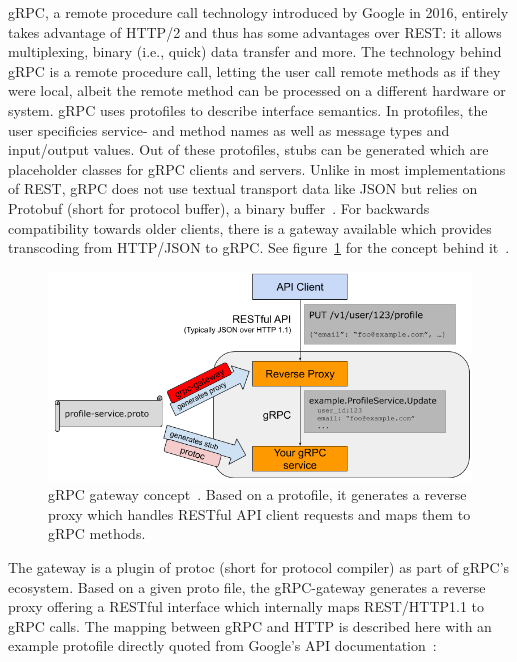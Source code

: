 gRPC, a remote procedure call technology introduced by Google in 2016, entirely takes advantage of HTTP/2 and thus has some advantages over REST: it allows multiplexing, binary (i.e., quick) data transfer and more. The technology behind gRPC is a remote procedure call, letting the user call remote methods as if they were local, albeit the remote method can be processed on a different hardware or system. gRPC uses protofiles to describe interface semantics. In protofiles, the user specificies service- and method names as well as message types and input/output values. Out of these protofiles, stubs can be generated which are placeholder classes for gRPC clients and servers. Unlike in most implementations of REST, gRPC does not use textual transport data like JSON but relies on Protobuf (short for protocol buffer), a binary buffer~\cite{Google-Cloud-Documentation2018Cloud2018}. For backwards compatibility towards older clients, there is a gateway available which provides transcoding from HTTP/JSON to gRPC. See figure~\ref{ESP} for the concept behind it~\cite{gRPC-Gateway-Documentation2017Grpc-gateway.2018}.

\begin{figure}[ht]
	\centering
  \includegraphics[width=\textwidth]{img/grpc_gateway.png}
	\caption[gRPC gateway concept]{gRPC gateway concept~\cite{gRPC-Gateway-Documentation2017Grpc-gateway.2018}. Based on a protofile, it generates a reverse proxy which handles RESTful API client requests and maps them to gRPC methods.}
	\label{ESP}
\end{figure}

The gateway is a plugin of protoc (short for protocol compiler) as part of gRPC's ecosystem. Based on a given proto file, the gRPC-gateway generates a reverse proxy offering a RESTful interface which internally maps REST/HTTP1.1 to gRPC calls. The mapping between gRPC and HTTP is described here with an example protofile directly quoted from Google's API documentation~\cite{Google-API-Documentation2019Http.proto.2019}:\\

